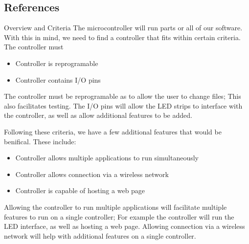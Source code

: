 \documentclass[onecolumn, draftclsnofoot,10pt, compsoc]{IEEEtran}
\begin{document}
\newpage

\tableofcontents
\clearpage
\singlespace


		\subsection{References}

		\begingroup
			\renewcommand{\addcontentsline}[3]{}%
			\renewcommand{\section}[2]{}%

			
			

		\endgroup
		\newpage
	\section{Microcontroller}
		\subsection{Overview and Criteria}
		The microcontroller will run parts or all of our software. With this in mind,
		we need to find a controller that fits within certain criteria. The
		controller must
		\begin{itemize}
			\item Controller is reprogramable
			\item Controller contains I/O pins
		\end{itemize}
		The controller must be reprogramable as to allow the user to change files;
		This also facilitates testing. The I/O pins will allow the LED strips to
		interface with the controller, as well as allow additional features to be
		added.

		\vspace{5mm}
		\noindent Following these criteria, we have a few additional features that would be
		benifical. These include:
		\begin{itemize}
			\item Controller allows multiple applications to run simultaneously
			\item Controller allows connection via a wireless network
			\item Controller is capable of hosting a web page
		\end{itemize}
		Allowing the controller to run multiple applications will facilitate
		multiple features to run on a single controller; For example the controller
		will run the LED interface, as well as hosting a web page. Allowing
		connection via a wireless network will help with additional features on a
		single controller.
\end{document}
